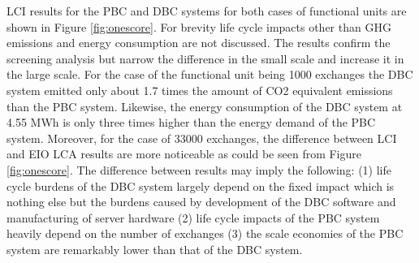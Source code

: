 \documentclass[3p,times,procedia]{elsarticle}
\begin{document}
LCI results for the PBC and DBC systems for both cases of functional units are shown in Figure \ref{fig:onescore}. For brevity life cycle impacts other than GHG emissions and energy consumption are not discussed. The results confirm the screening analysis but narrow the difference in the small scale and increase it in the large scale. For the case of the functional unit being 1000 exchanges the DBC system emitted only about 1.7 times the amount of CO2 equivalent emissions than the PBC system. Likewise, the energy consumption of the DBC system at 4.55 MWh is only three times higher than the energy demand of the PBC system. Moreover, for the case of 33000 exchanges, the difference between LCI and EIO LCA results are more noticeable as could be seen from Figure \ref{fig:onescore}. The difference between results may imply the following: (1) life cycle burdens of the DBC system largely depend on the fixed impact which is nothing else but the burdens caused by development of the DBC software and manufacturing of server hardware (2) life cycle impacts of the PBC system heavily depend on the number of exchanges (3) the scale economies of the PBC system are remarkably lower than that of the DBC system.
\end{document}
